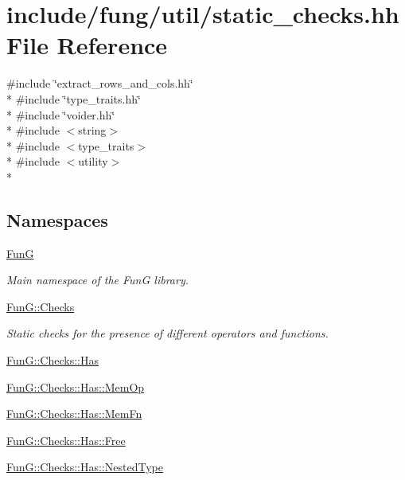 \hypertarget{static__checks_8hh}{\section{include/fung/util/static\-\_\-checks.hh File Reference}
\label{static__checks_8hh}
}
{\ttfamily \#include \char`\"{}extract\-\_\-rows\-\_\-and\-\_\-cols.\-hh\char`\"{}}\\*
{\ttfamily \#include \char`\"{}type\-\_\-traits.\-hh\char`\"{}}\\*
{\ttfamily \#include \char`\"{}voider.\-hh\char`\"{}}\\*
{\ttfamily \#include $<$string$>$}\\*
{\ttfamily \#include $<$type\-\_\-traits$>$}\\*
{\ttfamily \#include $<$utility$>$}\\*
\subsection*{Namespaces}
\begin{DoxyCompactItemize}
\item 
\hyperlink{namespaceFunG}{Fun\-G}
\begin{DoxyCompactList}\small\item\em Main namespace of the Fun\-G library. \end{DoxyCompactList}\item 
\hyperlink{namespaceFunG_1_1Checks}{Fun\-G\-::\-Checks}
\begin{DoxyCompactList}\small\item\em Static checks for the presence of different operators and functions. \end{DoxyCompactList}\item 
\hyperlink{namespaceFunG_1_1Checks_1_1Has}{Fun\-G\-::\-Checks\-::\-Has}
\item 
\hyperlink{namespaceFunG_1_1Checks_1_1Has_1_1MemOp}{Fun\-G\-::\-Checks\-::\-Has\-::\-Mem\-Op}
\item 
\hyperlink{namespaceFunG_1_1Checks_1_1Has_1_1MemFn}{Fun\-G\-::\-Checks\-::\-Has\-::\-Mem\-Fn}
\item 
\hyperlink{namespaceFunG_1_1Checks_1_1Has_1_1Free}{Fun\-G\-::\-Checks\-::\-Has\-::\-Free}
\item 
\hyperlink{namespaceFunG_1_1Checks_1_1Has_1_1NestedType}{Fun\-G\-::\-Checks\-::\-Has\-::\-Nested\-Type}
\end{DoxyCompactItemize}

